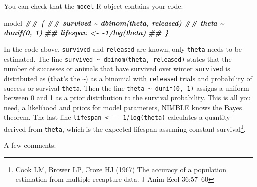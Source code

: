 \documentclass[
  12pt,
]{krantz}
\newenvironment{Shaded}{\begin{snugshade}}{\end{snugshade}}
\newcommand{\DocumentationTok}[1]{\textcolor[rgb]{0.56,0.35,0.01}{\textbf{\textit{#1}}}}
\newcommand{\NormalTok}[1]{#1}
\begin{document}
You can check that the \texttt{model} R object contains your code:

\begin{Shaded}
\begin{Highlighting}[]
\NormalTok{model}
\DocumentationTok{\#\# \{}
\DocumentationTok{\#\#     survived \textasciitilde{} dbinom(theta, released)}
\DocumentationTok{\#\#     theta \textasciitilde{} dunif(0, 1)}
\DocumentationTok{\#\#     lifespan \textless{}{-} {-}1/log(theta)}
\DocumentationTok{\#\# \}}
\end{Highlighting}
\end{Shaded}

In the code above, \texttt{survived} and \texttt{released} are known, only \texttt{theta} needs to be estimated. The line \texttt{survived\ \textasciitilde{}\ dbinom(theta,\ released)} states that the number of successes or animals that have survived over winter \texttt{survived} is distributed as (that's the \texttt{\textasciitilde{}}) as a binomial with \texttt{released} trials and probability of success or survival \texttt{theta}. Then the line \texttt{theta\ \textasciitilde{}\ dunif(0,\ 1)} assigns a uniform between 0 and 1 as a prior distribution to the survival probability. This is all you need, a likelihood and priors for model parameters, NIMBLE knows the Bayes theorem. The last line \texttt{lifespan\ \textless{}-\ -\ 1/log(theta)} calculates a quantity derived from \texttt{theta}, which is the expected lifespan assuming constant survival\footnote{Cook LM, Brower LP, Croze HJ (1967) The accuracy of a population estimation from multiple recapture data. J Anim Ecol 36:57--60}.

A few comments:
\end{document}
